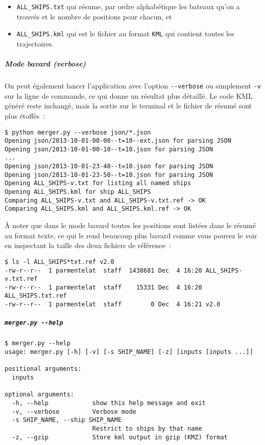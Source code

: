 \begin{itemize}
\tightlist
\item
  \texttt{ALL\_SHIPS.txt} qui résume, par ordre alphabétique les bateaux
  qu'on a trouvés et le nombre de positions pour chacun, et
\item
  \texttt{ALL\_SHIPS.kml} qui est le fichier au format \texttt{KML} qui
  contient toutes les trajectoires.
\end{itemize}

    \hypertarget{mode-bavard-verbose}{%
\subparagraph{Mode bavard (verbose)}\label{mode-bavard-verbose}}

    On peut également lancer l'application avec l'option
\texttt{-\/-verbose} ou simplement \texttt{-v} sur la ligne de commande,
ce qui donne un résultat plus détaillé. Le code KML généré reste
inchangé, mais la sortie sur le terminal et le fichier de résumé sont
plus étoffés~:

\begin{verbatim}
$ python merger.py --verbose json/*.json
Opening json/2013-10-01-00-00--t=10--ext.json for parsing JSON
Opening json/2013-10-01-00-10--t=10.json for parsing JSON
...
Opening json/2013-10-01-23-40--t=10.json for parsing JSON
Opening json/2013-10-01-23-50--t=10.json for parsing JSON
Opening ALL_SHIPS-v.txt for listing all named ships
Opening ALL_SHIPS.kml for ship ALL_SHIPS
Comparing ALL_SHIPS-v.txt and ALL_SHIPS-v.txt.ref -> OK
Comparing ALL_SHIPS.kml and ALL_SHIPS.kml.ref -> OK
\end{verbatim}

À noter que dans le mode bavard toutes les positions sont listées dans
le résumé au format texte, ce qui le rend beaucoup plus bavard comme
vous pouvez le voir en inspectant la taille des deux fichiers de
référence~:

\begin{verbatim}
$ ls -l ALL_SHIPS*txt.ref v2.0
-rw-r--r--  1 parmentelat  staff  1438681 Dec  4 16:20 ALL_SHIPS-v.txt.ref
-rw-r--r--  1 parmentelat  staff    15331 Dec  4 16:20 ALL_SHIPS.txt.ref
-rw-r--r--  1 parmentelat  staff        0 Dec  4 16:21 v2.0
\end{verbatim}

    \hypertarget{merger.py---help}{%
\subparagraph{\texorpdfstring{\texttt{merger.py\ -\/-help}}{merger.py -\/-help}}\label{merger.py---help}}

    \begin{verbatim}
$ merger.py --help
usage: merger.py [-h] [-v] [-s SHIP_NAME] [-z] [inputs [inputs ...]]

positional arguments:
  inputs

optional arguments:
  -h, --help            show this help message and exit
  -v, --verbose         Verbose mode
  -s SHIP_NAME, --ship SHIP_NAME
                        Restrict to ships by that name
  -z, --gzip            Store kml output in gzip (KMZ) format
\end{verbatim}

